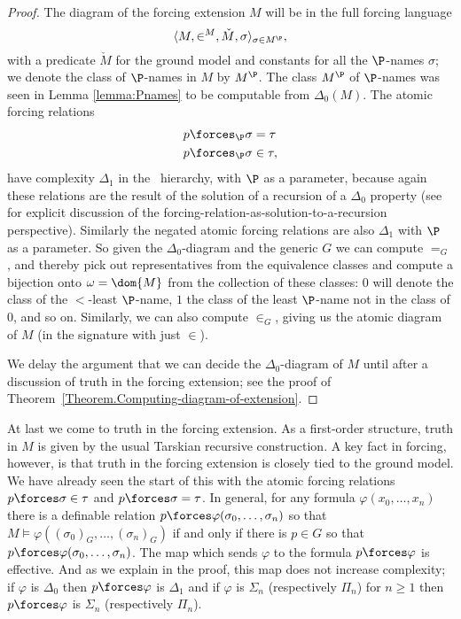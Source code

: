 \documentclass{amsart}
\begin{document}
 \begin{proof}
 The diagram of the forcing extension $M$ will be in the full forcing language
  $$\langle M,\in^{M},\check M,\sigma\rangle_{\sigma\in M^\P},$$
 with a predicate $\check M$ for the ground model and constants for all the $\P$-names $\sigma$; we denote the class of $\P$-names in $M$ by $M^\P$. The class $M^\P$ of $\P$-names was seen in Lemma \ref{lemma:Pnames}
 to be computable from $\Delta_0(M)$.
 The atomic forcing relations
 \begin{align*}
 p &\forces_\P \sigma = \tau \\
 p &\forces_\P \sigma \in \tau,
 \end{align*}
 have complexity $\Delta_1$ in the \Levy\ hierarchy, with $\P$ as a parameter, because again these relations are the result of the solution of a recursion of a $\Delta_0$ property (see \cite{GHHSW:to-appear} for explicit discussion of the forcing-relation-as-solution-to-a-recursion perspective). Similarly the negated atomic forcing relations are also $\Delta_1$ with $\P$ as a parameter.
 So given the $\Delta_0$-diagram and the generic $G$ we can compute $=_G$, and thereby pick out representatives from the equivalence classes and compute a bijection onto $\omega=\dom{M}$ from the collection of these classes: $0$ will
 denote the class of the $<$-least $\P$-name, $1$ the class of the least $\P$-name not in the class of $0$, and so on. Similarly, we can also compute $\in_G$, giving us the atomic diagram of $M$ (in the signature with just $\in$).
 
 We delay the argument that we can decide the $\Delta_0$-diagram of $M$ until after a discussion of truth in the forcing extension; see the proof of Theorem~\ref{Theorem.Computing-diagram-of-extension}.
 \end{proof}
 
 At last we come to truth in the forcing extension. As a first-order structure, truth in $M$ is given by the usual Tarskian recursive construction. A key fact in forcing, however, is that truth in the forcing extension is closely tied to the ground model. We have already seen the start of this with the atomic forcing relations $p \forces \sigma \in \tau$ and $p \forces \sigma = \tau$. In general, for any formula $\varphi(x_0,\ldots,x_n)$ there is a definable relation $p \forces \varphi(\sigma_0,\ldots,\sigma_n)$ so that $M \models \varphi((\sigma_0)_G,\ldots,(\sigma_n)_G)$ if and only if there is $p \in G$ so that $p \forces \varphi(\sigma_0,\ldots,\sigma_n)$. The map which sends $\varphi$ to the formula $p \forces \varphi$ is effective. And as we explain in the proof, this map does not increase complexity; if $\varphi$ is $\Delta_0$ then $p \forces \varphi$ is $\Delta_1$ and if $\varphi$ is $\Sigma_n$ (respectively $\Pi_n$) for $n \ge 1$ then $p \forces \varphi$ is $\Sigma_n$ (respectively $\Pi_n$).
 
\end{document}
